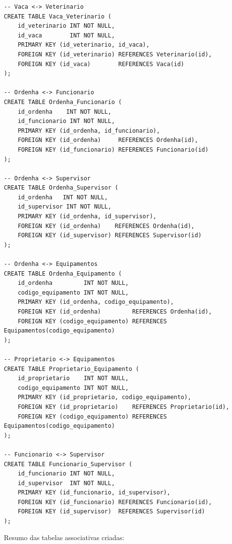 \documentclass[12pt]{article}
\begin{document}
\begin{lstlisting}[caption={Todas as tabelas associativas (N:N)}]
-- Vaca <-> Veterinario
CREATE TABLE Vaca_Veterinario (
    id_veterinario INT NOT NULL,
    id_vaca        INT NOT NULL,
    PRIMARY KEY (id_veterinario, id_vaca),
    FOREIGN KEY (id_veterinario) REFERENCES Veterinario(id),
    FOREIGN KEY (id_vaca)        REFERENCES Vaca(id)
);

-- Ordenha <-> Funcionario
CREATE TABLE Ordenha_Funcionario (
    id_ordenha    INT NOT NULL,
    id_funcionario INT NOT NULL,
    PRIMARY KEY (id_ordenha, id_funcionario),
    FOREIGN KEY (id_ordenha)     REFERENCES Ordenha(id),
    FOREIGN KEY (id_funcionario) REFERENCES Funcionario(id)
);

-- Ordenha <-> Supervisor
CREATE TABLE Ordenha_Supervisor (
    id_ordenha   INT NOT NULL,
    id_supervisor INT NOT NULL,
    PRIMARY KEY (id_ordenha, id_supervisor),
    FOREIGN KEY (id_ordenha)    REFERENCES Ordenha(id),
    FOREIGN KEY (id_supervisor) REFERENCES Supervisor(id)
);

-- Ordenha <-> Equipamentos
CREATE TABLE Ordenha_Equipamento (
    id_ordenha         INT NOT NULL,
    codigo_equipamento INT NOT NULL,
    PRIMARY KEY (id_ordenha, codigo_equipamento),
    FOREIGN KEY (id_ordenha)         REFERENCES Ordenha(id),
    FOREIGN KEY (codigo_equipamento) REFERENCES Equipamentos(codigo_equipamento)
);

-- Proprietario <-> Equipamentos
CREATE TABLE Proprietario_Equipamento (
    id_proprietario    INT NOT NULL,
    codigo_equipamento INT NOT NULL,
    PRIMARY KEY (id_proprietario, codigo_equipamento),
    FOREIGN KEY (id_proprietario)    REFERENCES Proprietario(id),
    FOREIGN KEY (codigo_equipamento) REFERENCES Equipamentos(codigo_equipamento)
);

-- Funcionario <-> Supervisor
CREATE TABLE Funcionario_Supervisor (
    id_funcionario INT NOT NULL,
    id_supervisor  INT NOT NULL,
    PRIMARY KEY (id_funcionario, id_supervisor),
    FOREIGN KEY (id_funcionario) REFERENCES Funcionario(id),
    FOREIGN KEY (id_supervisor)  REFERENCES Supervisor(id)
);
\end{lstlisting}

\vspace{0.3cm}

\noindent Resumo das tabelas associativas criadas:
\end{document}

